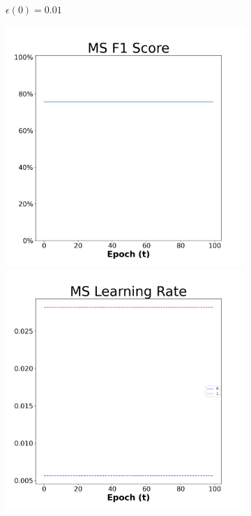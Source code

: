 \begin{figure}[H]
\begin{subfigure}{0.3\textwidth}
  \caption{$\epsilon(0)=0.01$}
\end{subfigure}\hfil %
\begin{subfigure}{0.3\textwidth}
  \includegraphics[width=\linewidth]{images/exper2/NSP/MS_0.03_f1.png}
  \includegraphics[width=\linewidth]{images/exper2/NSP/MS_0.03_lr.png}

\end{subfigure}
\end{figure}
